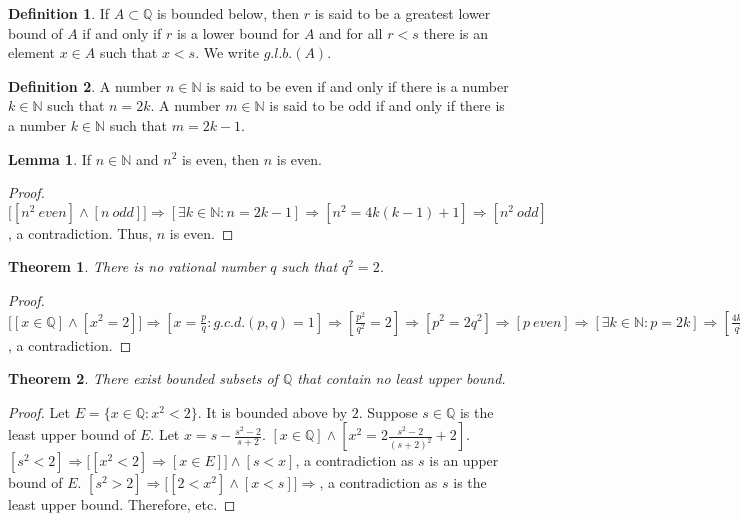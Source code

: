 \documentclass[oneside]{book}
\newtheorem{theorem}{Theorem}[section]
\theoremstyle{definition}
\newtheorem{definition}{Definition}[section]
\newtheorem{lemma}{Lemma}[section]
\begin{document}
\begin{definition}
If $A\subset \mathbb{Q}$ is bounded below, then $r$ is said to be a greatest lower bound of $A$ if and only if $r$ is a lower bound for $A$ and for all $r<s$ there is an element $x\in A$ such that $x<s$. We write $g.l.b.(A)$.
\end{definition}

\begin{definition}
A number $n\in \mathbb{N}$ is said to be even if and only if there is a number $k\in \mathbb{N}$ such that $n=2k$. A number $m\in \mathbb{N}$ is said to be odd if and only if there is a number $k\in \mathbb{N}$ such that $m=2k-1$.
\end{definition}

\begin{lemma}
If $n\in \mathbb{N}$ and $n^2$ is even, then $n$ is even.
\end{lemma}
\begin{proof}
$\big[[n^2\ even]\land [n\ odd]\big]\Rightarrow [\exists k\in \mathbb{N}:n=2k-1]\Rightarrow [n^2 = 4k(k-1)+1]\Rightarrow [n^2\ odd]$, a contradiction. Thus, $n$ is even.
\end{proof}

\begin{theorem}
There is no rational number $q$ such that $q^2 = 2$.
\end{theorem}
\begin{proof}
$\big[[x\in \mathbb{Q}]\land [x^2=2]\big]\Rightarrow [x= \frac{p}{q}:g.c.d.(p,q)=1]\Rightarrow [\frac{p^2}{q^2}= 2]\Rightarrow [p^2 = 2q^2]\Rightarrow [p\ even]\Rightarrow [\exists k\in \mathbb{N}:p=2k]\Rightarrow [\frac{4k^2}{q^2}=2]\Rightarrow [q^2 = 2k^2]\Rightarrow [q\ even]\Rightarrow [g.c.d.(p,q)\geq 2]$, a contradiction.
\end{proof}

\begin{theorem}
There exist bounded subsets of $\mathbb{Q}$ that contain no least upper bound.
\end{theorem}
\begin{proof}
Let $E=\{x\in \mathbb{Q}:x^2 < 2\}$. It is bounded above by $2$. Suppose $s\in \mathbb{Q}$ is the least upper bound of $E$. Let $x = s - \frac{s^2-2}{s+2}$. $[x\in \mathbb{Q}] \land [x^2 = 2\frac{s^2-2}{(s+2)^2}+2]$. $[s^2<2]\Rightarrow \big[[x^2<2 ]\Rightarrow [x\in E]\big]\land [s<x]$, a contradiction as $s$ is an upper bound of $E$. $[s^2>2]\Rightarrow \big[[2<x^2 ]\land [x<s]\big]\Rightarrow$, a contradiction as $s$ is the least upper bound. Therefore, etc.
\end{proof}
\end{document}
